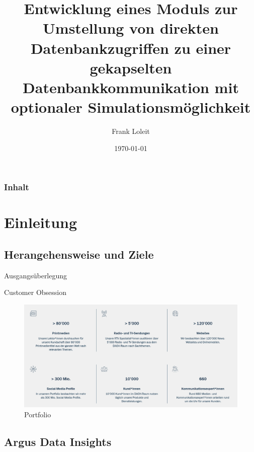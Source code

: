 \documentclass{beamer}
\title{Entwicklung eines Moduls zur Umstellung von direkten Datenbankzugriffen zu einer gekapselten Datenbankkommunikation mit optionaler Simulationsmöglichkeit}
\author{Frank Loleit}
\institute{Fachinformatiker (Anwendungsentwicklung)}
\date{\today}
\makeatletter
\newcommand*{\currentname}{\@currentlabelname}
\makeatother
\begin{document}
\begin{frame}
\titlepage
\end{frame}

\begin{frame}
    \frametitle{Inhalt}
    \tableofcontents
\end{frame}

\section{Einleitung}
    \subsection{Herangehensweise und Ziele}
    
        \begin{frame}{Ausgangsüberlegung}
            \begin{definition}{Customer Obsession}
                    
            \end{definition}
        \end{frame}
        
        
        
        \begin{frame}{\insertsectionnumber\space \currentname}
            \begin{figure}[htp]
                \centering
                \includegraphics[scale=0.23]{ArgusProfil.png}
                \caption{Portfolio}
                \label{fig:my_label}
            \end{figure}
        \end{frame}
        
    \subsection{Argus Data Insights}
    
\end{document}
